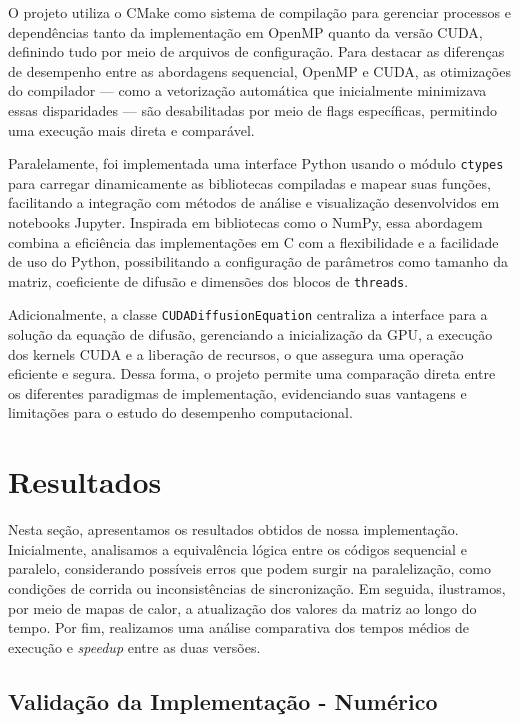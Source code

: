 \documentclass[12pt]{article}
\begin{document}
O projeto utiliza o CMake como sistema de compilação para gerenciar processos e
dependências tanto da implementação em OpenMP quanto da versão CUDA, definindo
tudo por meio de arquivos de configuração. Para destacar as diferenças de
desempenho entre as abordagens sequencial, OpenMP e CUDA, as otimizações do
compilador — como a vetorização automática que inicialmente minimizava essas
disparidades — são desabilitadas por meio de flags específicas, permitindo uma
execução mais direta e comparável.

Paralelamente, foi implementada uma interface Python usando o módulo
\texttt{ctypes} para carregar dinamicamente as bibliotecas compiladas e mapear
suas funções, facilitando a integração com métodos de análise e visualização
desenvolvidos em notebooks Jupyter. Inspirada em bibliotecas como o NumPy, essa
abordagem combina a eficiência das implementações em C com a flexibilidade e a
facilidade de uso do Python, possibilitando a configuração de parâmetros como
tamanho da matriz, coeficiente de difusão e dimensões dos blocos de
\texttt{threads}.

Adicionalmente, a classe \texttt{CUDADiffusionEquation} centraliza a interface
para a solução da equação de difusão, gerenciando a inicialização da GPU, a
execução dos kernels CUDA e a liberação de recursos, o que assegura uma
operação eficiente e segura. Dessa forma, o projeto permite uma comparação
direta entre os diferentes paradigmas de implementação, evidenciando suas
vantagens e limitações para o estudo do desempenho computacional.

\section{Resultados}

Nesta seção, apresentamos os resultados obtidos de nossa implementação.
Inicialmente, analisamos a equivalência lógica entre os códigos sequencial e
paralelo, considerando possíveis erros que podem surgir na paralelização, como
condições de corrida ou inconsistências de sincronização. Em seguida,
ilustramos, por meio de mapas de calor, a atualização dos valores da matriz ao
longo do tempo. Por fim, realizamos uma análise comparativa dos tempos médios
de execução e \textit{speedup} entre as duas versões.

\subsection{Validação da Implementação - Numérico}
\end{document}
